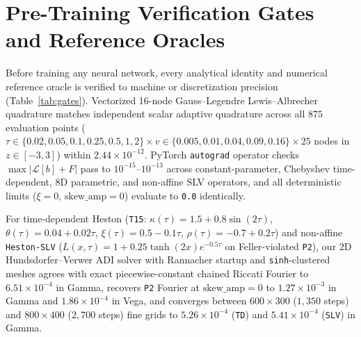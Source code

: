 \documentclass[11pt,a4paper]{article}
\begin{document}
\section{Pre-Training Verification Gates and Reference Oracles}
\label{sec:gates}

Before training any neural network, every analytical identity and numerical reference oracle is verified to machine or discretization precision (Table~\ref{tab:gates}). Vectorized 16-node Gauss--Legendre Lewis--Albrecher quadrature matches independent scalar adaptive quadrature across all $875$ evaluation points ($\tau \in \{0.02, 0.05, 0.1, 0.25, 0.5, 1, 2\} \times v \in \{0.005, 0.01, 0.04, 0.09, 0.16\} \times 25$ nodes in $z \in [-3, 3]$) within $2.44 \times 10^{-12}$. PyTorch \texttt{autograd} operator checks $\max|\mathcal{L}[b] + F|$ pass to $10^{-15}\text{--}10^{-13}$ across constant-parameter, Chebyshev time-dependent, 8D parametric, and non-affine SLV operators, and all deterministic limits ($\xi = 0$, $\mathrm{skew\_amp} = 0$) evaluate to \texttt{0.0} identically.

For time-dependent Heston (\texttt{T15}: $\kappa(\tau) = 1.5 + 0.8\sin(2\tau)$, $\theta(\tau) = 0.04 + 0.02\tau$, $\xi(\tau) = 0.5 - 0.1\tau$, $\rho(\tau) = -0.7 + 0.2\tau$) and non-affine \texttt{Heston-SLV} ($L(x,\tau) = 1 + 0.25\tanh(2x)e^{-0.5\tau}$ on Feller-violated \texttt{P2}), our 2D Hundsdorfer--Verwer ADI solver with Rannacher startup and \texttt{sinh}-clustered meshes agrees with exact piecewise-constant chained Riccati Fourier to $6.51 \times 10^{-4}$ in Gamma, recovers \texttt{P2} Fourier at $\mathrm{skew\_amp}=0$ to $1.27 \times 10^{-3}$ in Gamma and $1.86 \times 10^{-4}$ in Vega, and converges between $600\times 300$ ($1{,}350$ steps) and $800\times 400$ ($2{,}700$ steps) fine grids to $5.26 \times 10^{-4}$ (\texttt{TD}) and $5.41 \times 10^{-4}$ (\texttt{SLV}) in Gamma.
\end{document}
